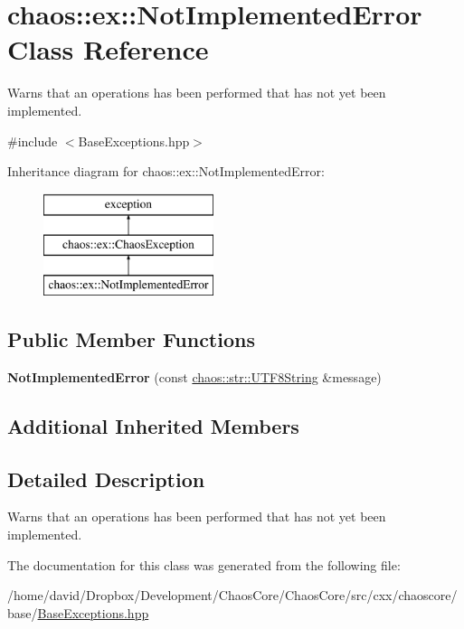 \hypertarget{classchaos_1_1ex_1_1_not_implemented_error}{\section{chaos\-:\-:ex\-:\-:Not\-Implemented\-Error Class Reference}
\label{classchaos_1_1ex_1_1_not_implemented_error}
}


Warns that an operations has been performed that has not yet been implemented.  




{\ttfamily \#include $<$Base\-Exceptions.\-hpp$>$}

Inheritance diagram for chaos\-:\-:ex\-:\-:Not\-Implemented\-Error\-:\begin{figure}[H]
\begin{center}
\leavevmode
\includegraphics[height=3.000000cm]{classchaos_1_1ex_1_1_not_implemented_error}
\end{center}
\end{figure}
\subsection*{Public Member Functions}
\begin{DoxyCompactItemize}
\item 
\hypertarget{classchaos_1_1ex_1_1_not_implemented_error_ae265436ed431e4e7ab94b7ebd6e393a7}{{\bfseries Not\-Implemented\-Error} (const \hyperlink{classchaos_1_1str_1_1_u_t_f8_string}{chaos\-::str\-::\-U\-T\-F8\-String} \&message)}\label{classchaos_1_1ex_1_1_not_implemented_error_ae265436ed431e4e7ab94b7ebd6e393a7}

\end{DoxyCompactItemize}
\subsection*{Additional Inherited Members}


\subsection{Detailed Description}
Warns that an operations has been performed that has not yet been implemented. 

The documentation for this class was generated from the following file\-:\begin{DoxyCompactItemize}
\item 
/home/david/\-Dropbox/\-Development/\-Chaos\-Core/\-Chaos\-Core/src/cxx/chaoscore/base/\hyperlink{_base_exceptions_8hpp}{Base\-Exceptions.\-hpp}\end{DoxyCompactItemize}
